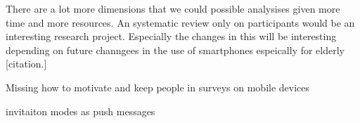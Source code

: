 There are a lot more dimensions that we could possible analysises given more time and more resources. An systematic review only on participants would be an interesting research project. Especially the changes in this will be interesting depending on future channgees in the use of smartphones espeically for elderly [citation.]

Missing how to motivate and keep people in surveys on mobile devices

invitaiton modes as push messages